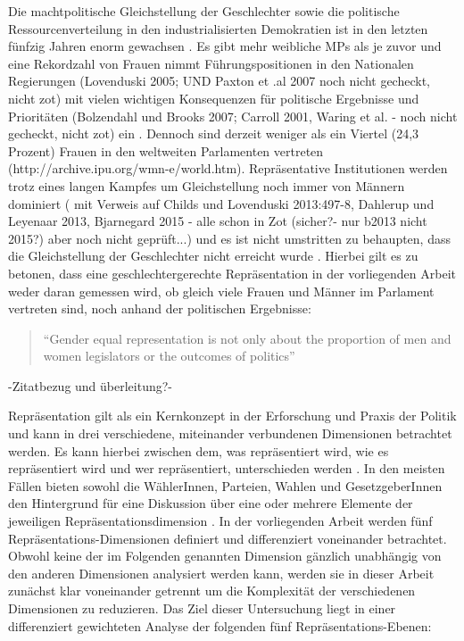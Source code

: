 \documentclass[12pt, 
    twoside=false, 
    bibliography=totoc, 
    numbers=endperiod, 
    headings=normal, 
    toc=chapterentrydotfill
    ]{scrbook}
\begin{document}
Die machtpolitische Gleichstellung der Geschlechter sowie die politische Ressourcenverteilung in den industrialisierten Demokratien ist in den letzten fünfzig Jahren enorm gewachsen \parencite[318]{coffe_2010}. Es gibt mehr weibliche MPs als je zuvor und eine Rekordzahl von Frauen nimmt Führungspositionen in den Nationalen Regierungen (Lovenduski 2005; UND Paxton et .al 2007 noch nicht gecheckt, nicht zot) mit vielen wichtigen Konsequenzen für politische Ergebnisse und Prioritäten (Bolzendahl und Brooks 2007; Carroll 2001, Waring et al. - noch nicht gecheckt, nicht zot) ein \parencite[318]{coffe_2010}. Dennoch sind derzeit weniger als ein Viertel (24,3 Prozent) Frauen in den weltweiten Parlamenten vertreten (http://archive.ipu.org/wmn-e/world.htm). Repräsentative Institutionen werden trotz eines langen Kampfes um Gleichstellung noch immer von Männern dominiert \parencites [149]{celis_2018}[497 f.]{childs_2013}{dahlerup_2013 mit leyenaar} ( mit Verweis auf Childs und Lovenduski 2013:497-8, Dahlerup und Leyenaar 2013, Bjarnegard 2015 - alle schon in Zot (sicher?- nur b2013 nicht 2015?) aber noch nicht geprüft...) und es ist nicht umstritten zu behaupten, dass die Gleichstellung der Geschlechter nicht erreicht wurde \parencite[150]{celis_2018}. Hierbei gilt es zu betonen, dass eine geschlechtergerechte Repräsentation in der vorliegenden Arbeit weder daran gemessen wird, ob gleich viele Frauen und Männer im Parlament vertreten sind, noch anhand der politischen Ergebnisse:

\begin{quote}
     
 \enquote{Gender equal representation is not only about the proportion of men and women legislators or the
outcomes of politics}\parencite[197]{erikson_2018}
 \end{quote}

-Zitatbezug und überleitung?- 

Repräsentation gilt als ein Kernkonzept in der Erforschung und Praxis der Politik und kann in drei verschiedene, miteinander verbundenen Dimensionen betrachtet werden. Es kann hierbei zwischen dem, was repräsentiert wird, wie es repräsentiert wird und wer repräsentiert, unterschieden werden \parencite[557]{galligan_2007}. In den meisten Fällen bieten sowohl die WählerInnen, Parteien, Wahlen und GesetzgeberInnen den Hintergrund für eine Diskussion über eine oder mehrere Elemente der jeweiligen Repräsentationsdimension \parencite[557]{galligan_2007}.
In der vorliegenden Arbeit werden fünf Repräsentations-Dimensionen definiert und differenziert voneinander betrachtet. Obwohl keine der im Folgenden genannten Dimension gänzlich unabhängig von den anderen Dimensionen analysiert werden kann, werden sie in dieser Arbeit zunächst klar voneinander getrennt um die Komplexität der verschiedenen Dimensionen zu reduzieren. Das Ziel dieser Untersuchung liegt in einer differenziert gewichteten Analyse der folgenden fünf Repräsentations-Ebenen: 
\end{document}
